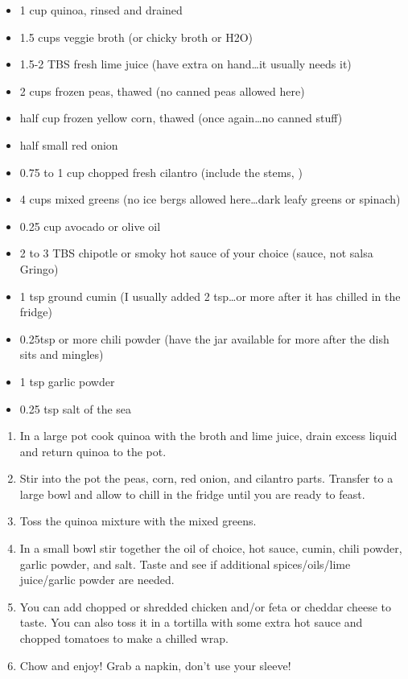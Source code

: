 \fromMom

\ingredients
\begin{itemize}
    \item 1 cup quinoa, rinsed and drained
    \item 1.5  cups veggie broth (or chicky broth or H2O)
    \item 1.5-2 TBS fresh lime juice (have extra on hand…it usually needs it)
    \item 2 cups frozen peas, thawed (no canned peas allowed here)
    \item half cup frozen yellow corn, thawed (once again…no canned stuff)
    \item half small red onion
    \item 0.75 to 1 cup chopped fresh cilantro (include the stems, )
    \item 4 cups mixed greens (no ice bergs allowed here…dark leafy greens or spinach)
    \item 0.25 cup avocado or olive oil
    \item 2 to 3 TBS chipotle or smoky hot sauce of your choice (sauce, not salsa Gringo)
    \item 1 tsp ground cumin (I usually added 2 tsp…or more after it has chilled in the fridge)
    \item 0.25tsp or more chili powder (have the jar available for more after the dish sits and mingles)
    \item 1 tsp garlic powder
    \item 0.25 tsp salt of the sea

\end{itemize}

\instructions
\begin{enumerate}
    \item In a large pot cook quinoa with the broth and lime juice, drain excess liquid and return quinoa to the pot.
\item Stir into the pot the peas, corn, red onion, and cilantro parts. Transfer to a large bowl and allow to chill in the fridge until you are ready to feast.
\item Toss the quinoa mixture with the mixed greens.
\item In a small bowl stir together the oil of choice, hot sauce, cumin, chili powder, garlic powder, and salt. Taste and see if additional spices/oils/lime juice/garlic powder are needed.
\item You can add chopped or shredded chicken and/or feta or cheddar cheese to taste. You can also toss it in a tortilla with some extra hot sauce and chopped tomatoes to make a chilled wrap.
\item Chow and enjoy! Grab a napkin, don't use your sleeve!

\end{enumerate}
